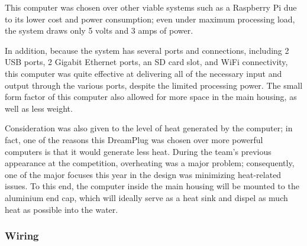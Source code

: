\documentclass[12pt, letterpaper, twocolumn, titlepage]{article}
\begin{document}
This computer was chosen over other viable systems such as a Raspberry Pi due to its lower cost and power consumption; even under maximum processing load, the system draws only 5 volts and 3 amps of power.

In addition, because the system has several ports and connections, including 2 USB ports, 2 Gigabit Ethernet ports, an SD card slot, and WiFi connectivity, this computer was quite effective at delivering all of the necessary input and output through the various ports, despite the limited processing power. The small form factor of this computer also allowed for more space in the main housing, as well as less weight.

Consideration was also given to the level of heat generated by the computer; in fact, one of the reasons this DreamPlug was chosen over more powerful computers is that it would generate less heat. During the team's previous appearance at the competition, overheating was a major problem; consequently, one of the major focuses this year in the design was minimizing heat-related issues. To this end, the computer inside the main housing will be mounted to the aluminium end cap, which will ideally serve as a heat sink and dispel as much heat as possible into the water.

\subsubsection{Wiring}
\end{document}
